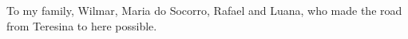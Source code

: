 \begin{dedicatory}
To my family, Wilmar, Maria do Socorro, Rafael and Luana, who
made the road from Teresina to here possible.
\end{dedicatory}
